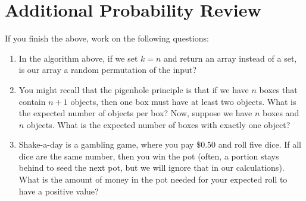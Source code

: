 \documentclass{article}
\begin{document}
\section*{Additional Probability Review}
If you finish the above, work on the following questions:
\begin{enumerate}
\item In the algorithm above, if we set $k=n$ and return an array instead of
a set, is our
array a random permutation of the input?
\item You might recall that the pigenhole principle is that if we have $n$
boxes that contain $n+1$ objects, then one box must have at least two
objects.  What is the expected number of objects per box?  Now, suppose
we have $n$ boxes and $n$ objects.  What is the
expected number of boxes with exactly one object?
\item Shake-a-day is a gambling game, where you pay $\$0.50$ and roll five
dice.  If all dice are the same number, then you win the pot (often, a
portion stays behind to seed the next pot, but we will ignore that in
our calculations).  What is the amount of money in the pot needed for
your expected roll to have a positive value?
\end{enumerate}
\end{document}
